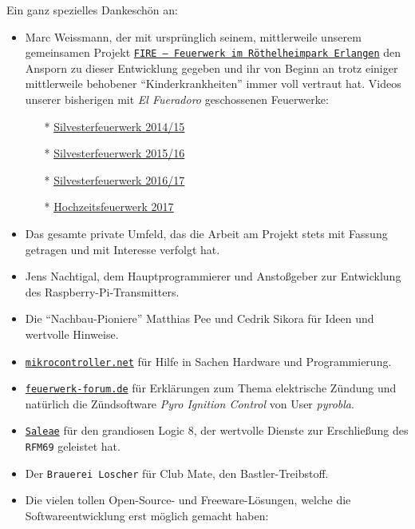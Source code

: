 \documentclass[paper=a4, parskip, numbers=noenddot, toc=listof, headsepline]{scrbook}
\newcommand{\pic}{\emph{Pyro Ignition Control}}
\newcommand{\anlage}{\emph{El Fueradoro}}
\begin{document}
			Ein ganz spezielles Dankeschön an:
			\begin{itemize}
				\item Marc Weissmann, der mit ursprünglich seinem, mittlerweile unserem gemeinsamen Projekt \href{http://www.facebook.com/FIREErlangen}{\texttt{FIRE~-- Feuerwerk im Röthel\-heim\-park Er\-langen}} den Ansporn zu dieser Entwicklung gegeben und ihr von Beginn an trotz einiger mittlerweile behobener \enquote{Kinderkrankheiten} immer voll vertraut hat. Videos unserer bisherigen mit {\anlage} geschossenen Feuerwerke:
						\begin{itemize}
							\item[*] \underline{\href{https://vimeo.com/116115628}{Silvesterfeuerwerk 2014/15}}
							\item[*] \underline{\href{https://vimeo.com/150594996}{Silvesterfeuerwerk 2015/16}}
							\item[*] \underline{\href{https://vimeo.com/198168273}{Silvesterfeuerwerk 2016/17}}
							\item[*] \underline{\href{https://www.youtube.com/watch?v=uPTW1dpsVoU}{Hochzeitsfeuerwerk 2017}}
						\end{itemize}
				\item Das gesamte private Umfeld, das die Arbeit am Projekt stets mit Fassung getragen und mit Interesse verfolgt hat.
				\item Jens Nachtigal, dem Hauptprogrammierer und Anstoßgeber zur Entwicklung des Raspberry-Pi-Transmitters.
				\item Die \enquote{Nachbau-Pioniere} Matthias Pee und Cedrik Sikora für Ideen und wertvolle Hinweise.
				\item \href{http://www.mikrocontroller.net}{\texttt{mikrocontroller.net}} für Hilfe in Sachen Hardware und Programmierung.
				\item \href{http://www.feuerwerk-forum.de}{\texttt{feuerwerk-forum.de}} für Erklärungen zum Thema elektrische Zündung und natürlich die Zündsoftware {\pic} von User \emph{pyrobla}.
				\item \href{http://www.saleae.com}{\texttt{Saleae}} für den grandiosen Logic 8, der wertvolle Dienste zur Erschließung des \texttt{RFM69} geleistet hat.
				\item Der \texttt{Brauerei Loscher} für Club Mate, den Bastler-Treibstoff.
				\item Die vielen tollen Open-Source- und Freeware-Lösungen, welche die Softwareentwicklung erst möglich gemacht haben:
						\begin{itemize}

\end{itemize}
\end{itemize}
\end{document}
